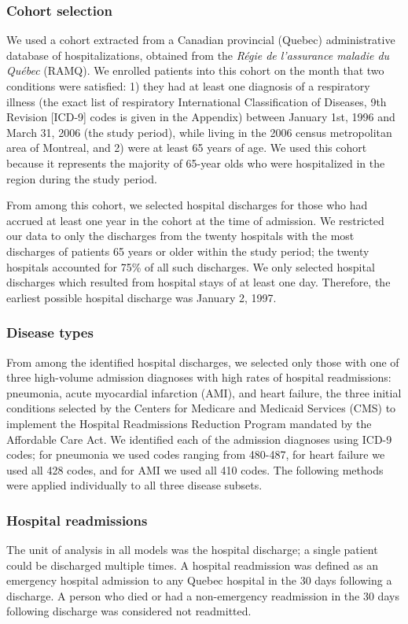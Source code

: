 \documentclass[]{article}
\begin{document}
\subsubsection{Cohort selection}
We used a cohort extracted from a Canadian provincial (Quebec) administrative database of hospitalizations, obtained from the \emph{Régie de l'assurance maladie du Québec} (RAMQ). We enrolled patients into this cohort on the month that two conditions were satisfied: 1) they had at least one diagnosis of a respiratory illness (the exact list of respiratory International Classification of Diseases, 9th Revision [ICD-9] codes is given in the Appendix) between January 1st, 1996 and March 31, 2006 (the study period), while living in the 2006 census metropolitan area of Montreal, and 2) were at least 65 years of age. We used this cohort because it represents the majority of 65-year olds who were hospitalized in the region during the study period. 

From among this cohort, we selected hospital discharges for those who had accrued at least one year in the cohort at the time of admission. We restricted our data to only the discharges from the twenty hospitals with the most discharges of patients 65 years or older within the study period; the twenty hospitals accounted for 75\% of all such discharges.  We only selected hospital discharges which resulted from hospital stays of at least one day. Therefore, the earliest possible hospital discharge was January 2, 1997.

\subsubsection{Disease types}
From among the identified hospital discharges, we selected only those with one of three high-volume admission diagnoses with high rates of hospital readmissions: pneumonia, acute myocardial infarction (AMI), and heart failure, the three initial conditions selected by the Centers for Medicare and Medicaid Services (CMS) to implement the Hospital Readmissions Reduction Program mandated by the Affordable Care Act. We identified each of the admission diagnoses using ICD-9 codes; for pneumonia we used codes ranging from 480-487, for heart failure we used all 428 codes, and for AMI we used all 410 codes. The following methods were applied individually to all three disease subsets. 

\subsubsection{Hospital readmissions}
The unit of analysis in all models was the hospital discharge; a single patient could be discharged multiple times. A hospital readmission was defined as an emergency hospital admission to any Quebec hospital in the 30 days following a discharge.  A person who died or had a non-emergency readmission in the 30 days following discharge was considered not readmitted.
\end{document}
